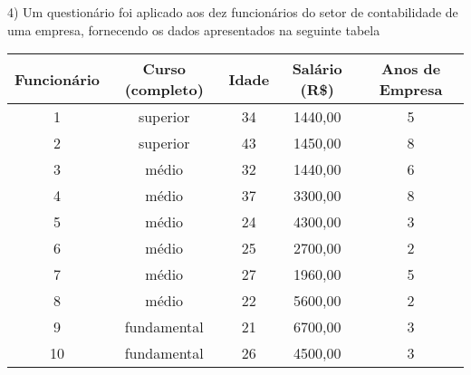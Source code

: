 \documentclass{article}
\begin{document}
4) Um questionário foi aplicado aos dez funcionários do setor de contabilidade de uma empresa, fornecendo os dados apresentados na seguinte tabela
\begin{table}[H]
\begin{tabular}{ccccc}
\hline
Funcionário & Curso (completo) & Idade & Salário (R\$) & Anos de Empresa \\ \hline
1           & superior         & 34    & 1440,00       & 5               \\
2           & superior         & 43    & 1450,00       & 8               \\
3           & médio            & 32    & 1440,00       & 6               \\
4           & médio            & 37    & 3300,00       & 8               \\
5           & médio            & 24    & 4300,00       & 3               \\
6           & médio            & 25    & 2700,00       & 2               \\
7           & médio            & 27    & 1960,00       & 5               \\
8           & médio            & 22    & 5600,00       & 2               \\
9           & fundamental      & 21    & 6700,00       & 3               \\
10          & fundamental      & 26    & 4500,00       & 3               \\ \hline
\end{tabular}
\end{table}
\end{document}
